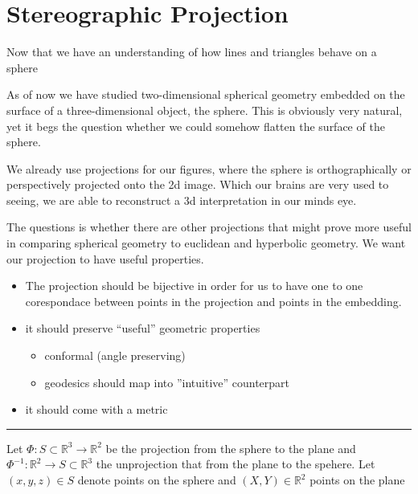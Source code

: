 \section{Stereographic Projection}\label{stereographic-projection}

Now that we have an understanding of how lines and triangles behave on a
sphere

As of now we have studied two-dimensional spherical geometry embedded on
the surface of a three-dimensional object, the sphere. This is obviously
very natural, yet it begs the question whether we could somehow flatten
the surface of the sphere.

We already use projections for our figures, where the sphere is
orthographically or perspectively projected onto the 2d image. Which our
brains are very used to seeing, we are able to reconstruct a 3d
interpretation in our minds eye.

The questions is whether there are other projections that might prove
more useful in comparing spherical geometry to euclidean and hyperbolic
geometry. We want our projection to have useful properties.

\begin{itemize}
\tightlist
\item
  The projection should be bijective in order for us to have one to one
  corespondace between points in the projection and points in the
  embedding.
\item
  it should preserve ``useful'' geometric properties

  \begin{itemize}
  \tightlist
  \item
    conformal (angle preserving)
  \item
    geodesics should map into ''intuitive'' counterpart
  \end{itemize}
\item
  it should come with a metric
\end{itemize}

\begin{center}\rule{0.5\linewidth}{0.5pt}\end{center}

Let \(\Phi: S \subset \mathbb{R}^3 \to \mathbb{R}^2\) be the projection
from the sphere to the plane and
\(\Phi^{-1}: \mathbb{R}^2 \to S \subset \mathbb{R}^3\) the unprojection
that from the plane to the spehere. Let \((x,y,z) \in S\) denote points
on the sphere and \((X,Y) \in \mathbb{R}^2\) points on the plane

